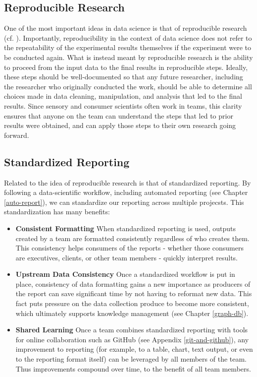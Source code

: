 \documentclass[
]{book}
\providecommand{\tightlist}{%
  \setlength{\itemsep}{0pt}\setlength{\parskip}{0pt}}
\begin{document}
\hypertarget{reproducible-research}{%
\subsection{Reproducible Research}\label{reproducible-research}}

One of the most important ideas in data science is that of reproducible research (cf. \citet{Peng2011}). Importantly, reproducibility in the context of data science does not refer to the repeatability of the experimental results themselves if the experiment were to be conducted again. What is instead meant by reproducible research is the ability to proceed from the input data to the final results in reproducible steps. Ideally, these steps should be well-documented so that any future researcher, including the researcher who originally conducted the work, should be able to determine all choices made in data cleaning, manipulation, and analysis that led to the final results. Since sensory and consumer scientists often work in teams, this clarity ensures that anyone on the team can understand the steps that led to prior results were obtained, and can apply those steps to their own research going forward.

\hypertarget{standardized-reporting}{%
\subsection{Standardized Reporting}\label{standardized-reporting}}

Related to the idea of reproducible research is that of standardized reporting. By following a data-scientific workflow, including automated reporting (see Chapter \ref{auto-report}), we can standardize our reporting across multiple projecsts. This standardization has many benefits:

\begin{itemize}
\tightlist
\item
  \textbf{Consistent Formatting} When standardized reporting is used, outputs created by a team are formatted consistently regardless of who creates them. This consistency helps consumers of the reports - whether those consumers are executives, clients, or other team members - quickly interpret results.
\item
  \textbf{Upstream Data Consistency} Once a standardized workflow is put in place, consistency of data formatting gains a new importance as producers of the report can save significant time by not having to reformat new data. This fact puts pressure on the data collection produce to become more consistent, which ultimately supports knowledge management (see Chapter \ref{graph-db}).
\item
  \textbf{Shared Learning} Once a team combines standardized reporting with tools for online collaboration such as GitHub (see Appendix \ref{git-and-github}), any improvement to reporting (for example, to a table, chart, text output, or even to the reporting format itself) can be leveraged by all members of the team. Thus improvements compound over time, to the benefit of all team members.
\end{itemize}
\end{document}
